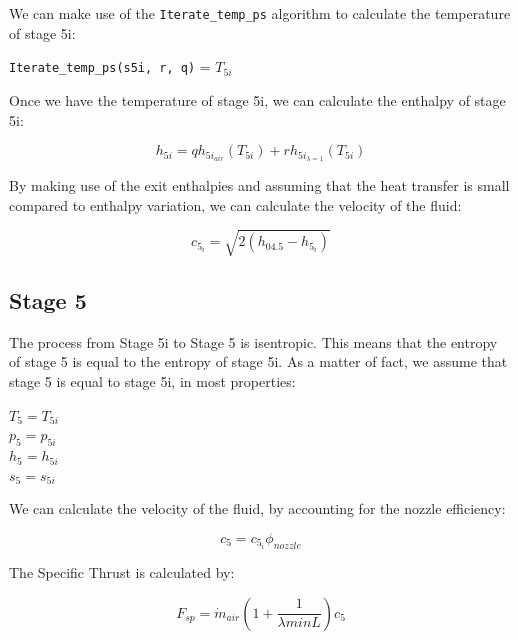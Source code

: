 \documentclass[titlepage]{article}
\begin{document}
    We can make use of the \verb|Iterate_temp_ps| algorithm to calculate the temperature of stage 5i:
    \begin{center}
        \verb|Iterate_temp_ps(s5i, r, q)| = $T_{5i}$
    \end{center}

    Once we have the temperature of stage 5i, we can calculate the enthalpy of stage 5i:

    \begin{equation}
        h_{5i} = q h_{5i_{air}}(T_{5i}) + r h_{5i_{\lambda=1}}(T_{5i})
    \end{equation}

    By making use of the exit enthalpies and assuming that the heat transfer is small compared to enthalpy variation, we can calculate the velocity of the fluid:

    \begin{equation}
        c_{5_{i}} = \sqrt{2(h_{04.5} - h_{5_{i}})}
    \end{equation}

    \subsection{Stage 5}

    The process from Stage 5i to Stage 5 is isentropic. This means that the entropy of stage 5 is equal to the entropy of stage 5i. 
    As a matter of fact, we assume that stage 5 is equal to stage 5i, in most properties:

    \begin{center}
        $T_{5} = T_{5i}$ \\
        $p_{5} = p_{5i}$ \\
        $h_{5} = h_{5i}$ \\
        $s_{5} = s_{5i}$ \\
    \end{center}

    We can calculate the velocity of the fluid, by accounting for the nozzle efficiency:

    \begin{equation}
        c_{5} = c_{5_{i}} \phi_{nozzle}
    \end{equation}

    The Specific Thrust is calculated by:

    \begin{equation}
        F_{sp} = \dot{m}_{air} \left(1 + \frac{1}{\lambda minL}\right) c_{5}
    \end{equation}
\end{document}
